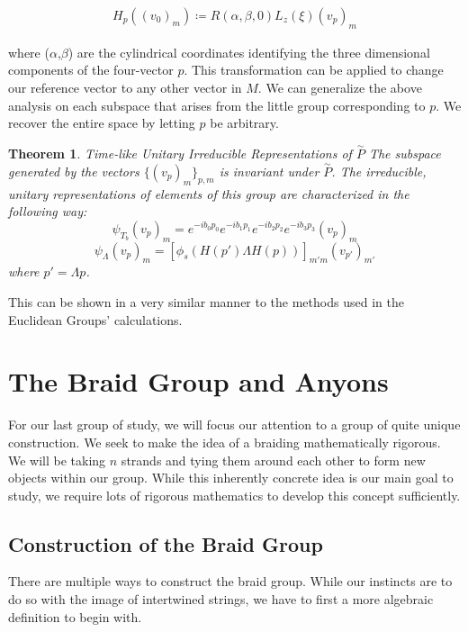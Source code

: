 \documentclass[10pt]{ucthesis}
\newtheorem{theorem}[definition]{Theorem}
\begin{document}
\begin{equation}
\begin{aligned}
	H_p((v_0)_m) \coloneq R(\alpha,\beta,0)L_z(\xi)(v_p)_m
\end{aligned}
\end{equation}

where ($\alpha$,$\beta$) are the cylindrical coordinates identifying the three dimensional components of the four-vector $p$. This transformation can be applied to change our reference vector to any other vector in $M$. We can generalize the above analysis on each subspace that arises from the little group corresponding to $p$. We recover the entire space by letting $p$ be arbitrary.

\begin{theorem} Time-like Unitary Irreducible Representations of $\overset{\sim}{P}$
	The subspace generated by the vectors $\{(v_p)_m\}_{p,m}$ is invariant under $\overset{\sim}{P}$. The irreducible, unitary representations of elements of this group are characterized in the following way:
$$\psi_{T_b} (v_p)_m = e^{-ib_0p_0}e^{-ib_1p_1}e^{-ib_2p_2}e^{-ib_3p_3}(v_p)_m$$
$$\psi_\Lambda (v_p)_m = [\phi_s(H(p')\Lambda H(p))]_{m'm} (v_{p'})_{m'}$$
where $p' = \Lambda p$.
\end{theorem}

This can be shown in a very similar manner to the methods used in the Euclidean Groups' calculations. 


\chapter{The Braid Group and Anyons}

For our last group of study, we will focus our attention to a group of quite unique construction. We seek to make the idea of a braiding mathematically rigorous. We will be taking $n$ strands and tying them around each other to form new objects within our group. While this inherently concrete idea is our main goal to study, we require lots of rigorous mathematics to develop this concept sufficiently. 


\section{Construction of the Braid Group}

There are multiple ways to construct the braid group. While our instincts are to do so with the image of intertwined strings, we have to first a more algebraic definition to begin with.
\end{document}
